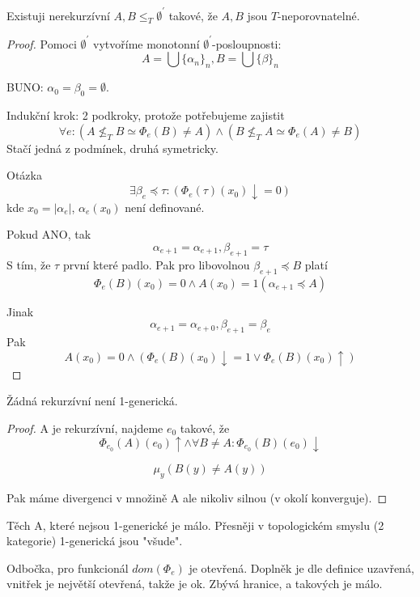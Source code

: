 \begin{theorem}
	Existuji nerekurzívní $A, B \leq_T \emptyset^{\prime}$ takové, že $A, B$ jsou $T$-neporovnatelné.
\end{theorem}
\begin{proof}
	Pomoci $\emptyset^{\prime}$ vytvoříme monotonní $\emptyset^{\prime}$-posloupnosti:
	\[ A = \bigcup \{\alpha_n\}_n, B = \bigcup \{\beta\}_n \]

	BUNO: $\alpha_0 = \beta_0 = \emptyset$.

	Indukční krok: 2 podkroky, protože potřebujeme zajistit
	\[ \forall e: (A \nleq_T B \simeq \Phi_e(B) \neq A) \land (B \nleq_T A \simeq \Phi_e(A) \neq B) \]
	Stačí jedná z podmínek, druhá symetricky.

	Otázka
	\[ \exists \beta_e \preccurlyeq \tau: (\Phi_e(\tau)(x_0)\downarrow = 0) \]
	kde $x_0 = |\alpha_e|$, $\alpha_e(x_0)$ není definované.

	Pokud ANO, tak
	\[ \alpha_{e + 1} = \alpha_{e + 1}, \beta_{e + 1} = \tau \]
	S tím, že $\tau$ první které padlo.
	Pak pro libovolnou $\beta_{e + 1} \preccurlyeq B$ platí
	\[ \Phi_e(B)(x_0) = 0 \land A(x_0) = 1 (\alpha_{e + 1} \preccurlyeq A)\]

	Jinak
	\[ \alpha_{e + 1} = \alpha_{e + 0}, \beta_{e + 1} = \beta_e \]
	Pak
	\[ A(x_0) = 0 \land (\Phi_e(B)(x_0) \downarrow = 1 \lor \Phi_e(B)(x_0) \uparrow) \]
\end{proof}

\begin{theorem}[R.S. a 1-generické]
	Žádná rekurzívní není 1-generická.
\end{theorem}
\begin{proof}
	A je rekurzívní, najdeme $e_0$ takové, že
	\[ \Phi_{e_0}(A)(e_0) \uparrow \land \forall B \neq A: \Phi_{e_0}(B)(e_0) \downarrow \]

	\[ \mu_y (B(y) \neq A(y)) \]

	Pak máme divergenci v množině A ale nikoliv silnou (v okolí konverguje).
\end{proof}

\begin{note}
	Těch A, které nejsou 1-generické je málo.
	Přesněji v topologickém smyslu (2 kategorie) 1-generická jsou "všude".

	Odbočka, pro funkcionál $dom(\Phi_e)$ je otevřená.
	Doplněk je dle definice uzavřená, vnitřek je největší otevřená, takže je ok.
	Zbývá hranice, a takových je málo.
\end{note}

